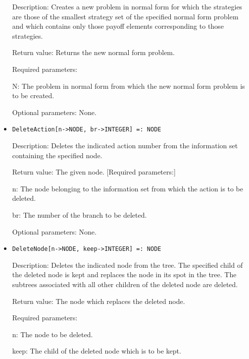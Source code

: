\begin{itemize}
\bd
\item
[Description:] Creates a new problem in normal form for which the
strategies are those of the smallest strategy set of the specified
normal form problem and which contains only those payoff elements
corresponding to those strategies.
\item
[Return value:] Returns the new normal form problem.
\item
[Required parameters:]\hfil\null
	
\bd
\item
[N:] The problem in normal form from which the new normal form problem
is to be created.
\ed

\item  
[Optional parameters:] None.
\ed

\item
\protect \large \begin{verbatim}
DeleteAction[n->NODE, br->INTEGER] =: NODE
\end{verbatim}\normalsize

\bd
\item
[Description:] Deletes the indicated action number from the
information set containing the specified node.
\item
[Return value:] The given node.  [Required parameters:]\hfil\null
	
\bd
\item
[n:] The node belonging to the information set from which the action
is to be deleted.
\item [br:] The number of the branch to be deleted.
\ed

\item
[Optional parameters:] None.
\ed

\item
\protect \large \begin{verbatim}
DeleteNode[n->NODE, keep->INTEGER] =: NODE
\end{verbatim}\normalsize

\bd
\item   
[Description:] Deletes the indicated node from the tree.  The
specified child of the deleted node is kept and replaces the node in
its spot in the tree.  The subtrees associated with all other children
of the deleted node are deleted.
\item
[Return value:] The node which replaces the deleted node.
\item
[Required parameters:]\hfil\null
	
\bd
\item
[n:] The node to be deleted.
\item
[keep:] The child of the deleted node which is to be kept.
\ed


\end{itemize}
